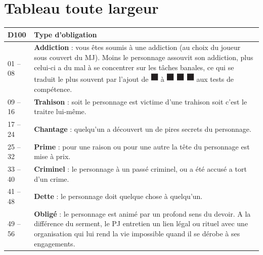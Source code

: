 \documentclass{article}
\begin{document}
\section*{Tableau toute largeur}
\renewcommand{\arraystretch}{1.4}
\begin{center}
	\begin{tabular}{|p{4.5cm}|p{12cm}|}
		\hline 
		\cellcolor{DarkRed} {\large \textcolor{PureWhite}{\textbf{D100}}} & \cellcolor{DarkRed} {\large \textcolor{PureWhite}{\textbf{Type d'obligation}}} \\
		\hline 
		01 -- 08 & \textbf{Addiction} : vous êtes soumis à une addiction (au choix du joueur sous couvert du MJ). Moins le personnage assouvit son addiction, plus celui-ci a du mal à se concentrer sur les tâches banales, ce qui se traduit le plus souvent par l'ajout de {\Large \includegraphics[height=\fontcharht\font`\B]{../img/dice_black}} à {\Large \includegraphics[height=\fontcharht\font`\B]{../img/dice_black}} {\Large \includegraphics[height=\fontcharht\font`\B]{../img/dice_black}} {\Large \includegraphics[height=\fontcharht\font`\B]{../img/dice_black}} aux tests de compétence. \\
		\hline 
		09 -- 16 & \textbf{Trahison} : soit le personnage est victime d'une trahison soit c'est le traitre lui-même. \\
		\hline 
		17 -- 24 & \textbf{Chantage} : quelqu'un a découvert un de pires secrets du personnage. \\
		\hline 
		25 -- 32 & \textbf{Prime} : pour une raison ou pour une autre la tête du personnage est mise à prix. \\
		\hline 
		33 -- 40 & \textbf{Criminel} : le personnage à un passé criminel, ou a été accusé a tort d'un crime. \\
		\hline 
		41 -- 48 & \textbf{Dette} : le personnage doit quelque chose à quelqu'un. \\
		\hline 
		49 -- 56 & \textbf{Obligé} : le personnage est animé par un profond sens du devoir. A la différence du serment, le PJ entretien un lien légal ou rituel avec une organisation qui lui rend la vie impossible quand il se dérobe à ses engagements. \\

\end{tabular}
\end{center}
\end{document}
